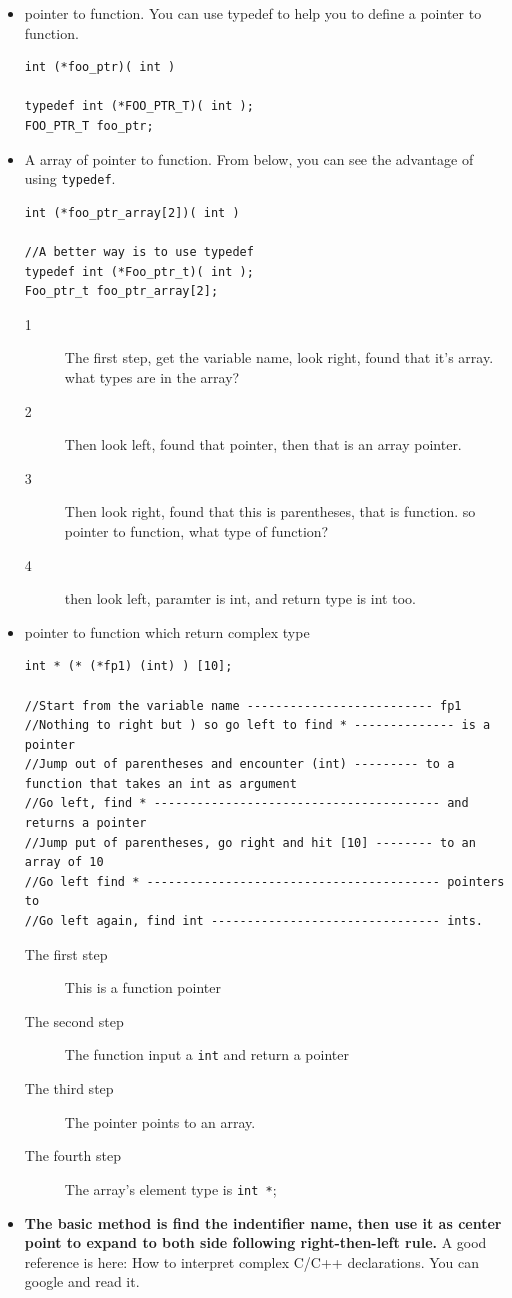 \documentclass[a4paper,11pt,twoside]{book}
\begin{document}
\begin{itemize}
	\item pointer to function. You can use typedef to help you to define a pointer to function.
\begin{lstlisting}
int (*foo_ptr)( int )

typedef int (*FOO_PTR_T)( int );
FOO_PTR_T foo_ptr;
\end{lstlisting}
	
	\item A array of pointer to function. From below, you can see the advantage of using \texttt{typedef}.
\begin{lstlisting}
int (*foo_ptr_array[2])( int )

//A better way is to use typedef
typedef int (*Foo_ptr_t)( int );
Foo_ptr_t foo_ptr_array[2];
\end{lstlisting}
	\begin{description}
		\item[1] The first step, get the variable name, look right, found that it's array. what types are in the array?
		\item[2] Then look left, found that pointer, then that is an array pointer.
		\item[3] Then look right, found that this is parentheses, that is function. so pointer to function, what type of function?
		\item[4] then look left, paramter is int, and return type is int too.
	\end{description}
	
	\item pointer to function which return complex type
\begin{lstlisting}
int * (* (*fp1) (int) ) [10];

//Start from the variable name -------------------------- fp1
//Nothing to right but ) so go left to find * -------------- is a pointer
//Jump out of parentheses and encounter (int) --------- to a function that takes an int as argument
//Go left, find * ---------------------------------------- and returns a pointer
//Jump put of parentheses, go right and hit [10] -------- to an array of 10
//Go left find * ----------------------------------------- pointers to
//Go left again, find int -------------------------------- ints.
\end{lstlisting}
	\begin{description}
		\item[The first step] This is a function pointer
		\item[The second step] The function input a \texttt{int} and return a pointer 
		\item[The third step] The pointer points to an array. 
		\item[The fourth step] The array's element type is \texttt{int *}; 
	\end{description}
	\item \textbf{The basic method is find the indentifier name, then use it as center point to expand to both side following right-then-left rule.} A good reference is here: How to interpret complex C/C++ declarations. You can google and read it. 
	
\end{itemize}
\end{document}
